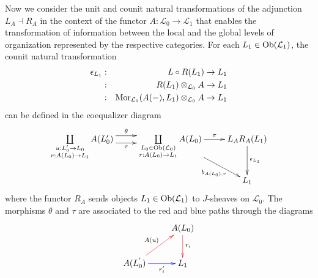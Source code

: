 \documentclass[aps,twocolumn]{revtex4-1}
\begin{document}
Now we consider the unit and counit natural transformations of the adjunction $L_A \dashv R_A$ in the context of the functor $A: \mathcal{L}_0 \rightarrow \mathcal{L}_1$ that enables the transformation of information between the local and the global levels of organization represented by the respective categories. For each $L_1 \in \mathop{\rm Ob}\nolimits(\mathcal{L}_1)$, the counit natural transformation
\begin{eqnarray*}
\epsilon_{L_1} &:& L \circ R(L_1) \rightarrow L_1\\
&:& R(L_1) \otimes_{\mathcal{L}_0} A \rightarrow L_1\\
&:& \mathop{\rm Mor}\nolimits_{\mathcal{L}_1}(A(-),L_1) \otimes_{\mathcal{L}_0} A \rightarrow L_1
\end{eqnarray*}
can be defined in the coequalizer diagram
\begin{displaymath}
\xymatrix{
\coprod\limits_{\substack{u : L'_0 \rightarrow L_0 \\ r:A(L_0) \rightarrow L_1}}
A(L'_0)
\ar@<1ex>[r]^-{\theta} \ar@<-1ex>[r]_-{\tau}
&
\coprod\limits_{\substack{L_0 \in \Ob(\mathcal{L}_0) \\ r:A(L_0) \rightarrow L_1}}
A(L_0)
\ar[r]^-{\pi} \ar[dr]_-{b_{A(L_0),r}}
&
L_A R_A(L_1) \ar[d]^-{\epsilon_{L_1}}\\
& & L_1
}
\end{displaymath}
where the functor $R_A$ sends objects $L_1 \in \mathop{\rm Ob}\nolimits(\mathcal{L}_1)$ to $J$-sheaves on $\mathcal{L}_0$. The morphisms $\theta$ and $\tau$ are associated to the red and blue paths through the diagrams
\begin{displaymath}
\xymatrix{
& A(L_0) \ar@[red][d]^{r_i} \\
A(L_0^{'}) \ar@[red][ur]^{A(u)} \ar@[blue][r]_-{r'_i} & L_1
}
\end{displaymath}
\end{document}
